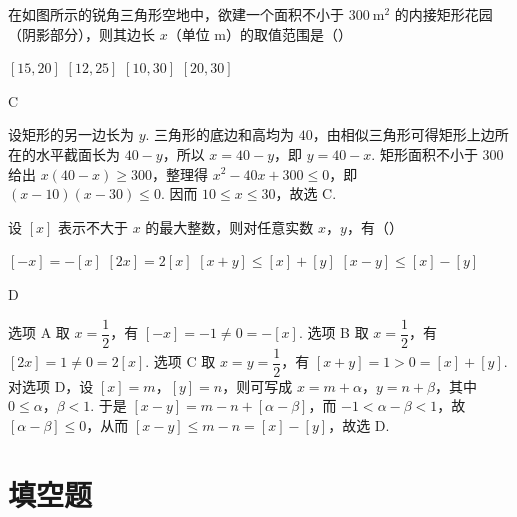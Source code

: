 \begin{problem}
在如图所示的锐角三角形空地中，欲建一个面积不小于 \(300 \mathrm{~m}^{2}\) 的内接矩形花园（阴影部分），则其边长 \(x\)（单位 \(\mathrm{m}\)）的取值范围是（\quad）


\choices
    {\(\left[15,20\right]\)}
    {\(\left[12,25\right]\)}
    {\(\left[10,30\right]\)}
    {\(\left[20,30\right]\)}

\begin{answer}
C
\end{answer}

\begin{solution}
设矩形的另一边长为 \(y\). 三角形的底边和高均为 \(40\)，由相似三角形可得矩形上边所在的水平截面长为 \(40-y\)，所以 \(x=40-y\)，即 \(y=40-x\). 矩形面积不小于 \(300\) 给出 \(x(40-x)\geqslant300\)，整理得 \(x^2-40x+300\leqslant0\)，即 \((x-10)(x-30)\leqslant0\). 因而 \(10\leqslant x\leqslant30\)，故选 C.
\end{solution}
\end{problem}

\begin{problem}
设 \([x]\) 表示不大于 \(x\) 的最大整数，则对任意实数 \(x\)，\(y\)，有（\quad）

\choices
    {\(\left[-x\right]=-\left[x\right]\)}
    {\(\left[2x\right]=2\left[x\right]\)}
    {\(\left[x+y\right]\leqslant\left[x\right]+\left[y\right]\)}
    {\(\left[x-y\right]\leqslant\left[x\right]-\left[y\right]\)}

\begin{answer}
D
\end{answer}

\begin{solution}
选项 A 取 \(x=\dfrac12\)，有 \(\left[-x\right]=-1\neq0=-\left[x\right]\). 选项 B 取 \(x=\dfrac12\)，有 \(\left[2x\right]=1\neq0=2\left[x\right]\). 选项 C 取 \(x=y=\dfrac12\)，有 \(\left[x+y\right]=1>0=\left[x\right]+\left[y\right]\). 对选项 D，设 \(\left[x\right]=m\)，\(\left[y\right]=n\)，则可写成 \(x=m+\alpha\)，\(y=n+\beta\)，其中 \(0\leqslant\alpha\)，\(\beta<1\). 于是 \(\left[x-y\right]=m-n+\left[\alpha-\beta\right]\)，而 \(-1<\alpha-\beta<1\)，故 \(\left[\alpha-\beta\right]\leqslant0\)，从而 \(\left[x-y\right]\leqslant m-n=\left[x\right]-\left[y\right]\)，故选 D.
\end{solution}
\end{problem}

\section{填空题}

